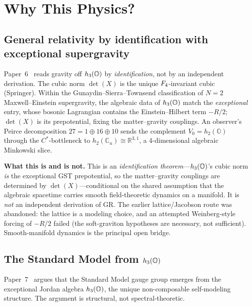 
\section{Why This Physics?}
\label{sec:why-this-physics}

\subsection{General relativity by identification with exceptional supergravity}
\label{subsec:gr}

Paper~6~\citep{ehrlich2026gr} reads gravity off $h_3(\mathbb{O})$ by
\emph{identification}, not by an independent derivation.  The cubic
norm $\det(X)$ is the unique $F_4$-invariant cubic (Springer).
Within the Gunaydin--Sierra--Townsend classification of $N{=}2$
Maxwell--Einstein supergravity, the algebraic data of $h_3(\mathbb{O})$ match
the \emph{exceptional} entry, whose bosonic Lagrangian contains the
Einstein--Hilbert term $-R/2$; $\det(X)$ is its prepotential, fixing
the matter--gravity couplings.  An observer's Peirce decomposition
$27 = 1 \oplus 16 \oplus 10$ sends the complement
$V_0 = h_2(\mathbb{O})$ through the $C^*$-bottleneck to
$h_2(\mathbb{C}_u) \cong \mathbb{R}^{3,1}$, a 4-dimensional algebraic
Minkowski slice.

\textbf{What this is and is not.}  This is an \emph{identification
theorem}---$h_3(\mathbb{O})$'s cubic norm \emph{is} the exceptional GST
prepotential, so the matter--gravity couplings are determined by
$\det(X)$---conditional on the shared assumption that the algebraic
spacetime carries smooth field-theoretic dynamics on a manifold.  It
is \emph{not} an independent derivation of GR.  The earlier
lattice/Jacobson route was abandoned: the lattice is a modeling
choice, and an attempted Weinberg-style forcing of $-R/2$ failed (the
soft-graviton hypotheses are necessary, not sufficient).
Smooth-manifold dynamics is the principal open bridge.

\subsection{The Standard Model from $h_3(\mathbb{O})$}
\label{subsec:sm}

Paper~7~\citep{ehrlich2026sm} argues that the Standard Model gauge
group emerges from the exceptional Jordan algebra $h_3(\mathbb{O})$, the
unique non-composable self-modeling structure.  The argument is
structural, not spectral-theoretic.

